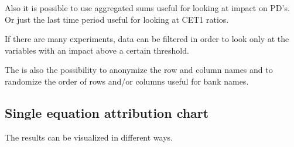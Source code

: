 \documentclass[letterpaper,10pt,english]{jupyterBook}
\begin{document}
\sphinxAtStartPar
Also it is possible to use aggregated sums \sphinxhyphen{} useful for looking at impact on PD’s. Or just the last time period \sphinxhyphen{} useful for looking at CET1 ratios.

\sphinxAtStartPar
If there are many experiments, data can be filtered in order to look only at the variables with an impact above a certain threshold.

\sphinxAtStartPar
The is also the possibility to   anonymize  the row and column names and to randomize
the order of rows and/or columns \sphinxhyphen{} useful for bank names.


\subsection{Single equation attribution chart}
\label{\detokenize{content/06_ModelAnalytics/Attribution:single-equation-attribution-chart}}
\sphinxAtStartPar
The results can be visualized in different ways.
\end{document}
